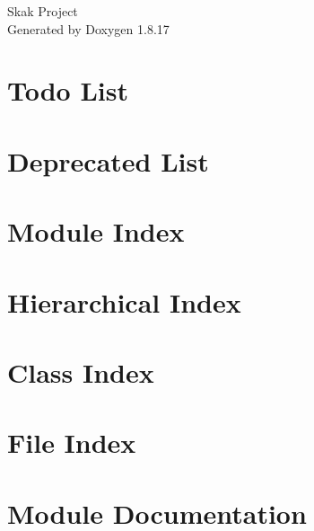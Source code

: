 \let\mypdfximage\pdfximage\def\pdfximage{\immediate\mypdfximage}\documentclass[twoside]{book}
\newcommand{\+}{\discretionary{\mbox{\scriptsize$\hookleftarrow$}}{}{}}
\newcommand{\clearemptydoublepage}{%
  \newpage{\pagestyle{empty}\cleardoublepage}%
}
\begin{document}
\hypersetup{pageanchor=false,
             bookmarksnumbered=true,
             pdfencoding=unicode
            }
\begin{titlepage}
\vspace*{7cm}
\begin{center}%
{\Large Skak Project }\\
\vspace*{1cm}
{\large Generated by Doxygen 1.8.17}\\
\end{center}
\end{titlepage}
\clearemptydoublepage
{}
\tableofcontents
\clearemptydoublepage
{}
\hypersetup{pageanchor=true}

\chapter{Todo List}
\label{todo}

\chapter{Deprecated List}
\label{deprecated}

\chapter{Module Index}

\chapter{Hierarchical Index}

\chapter{Class Index}

\chapter{File Index}

\chapter{Module Documentation}













\end{document}
